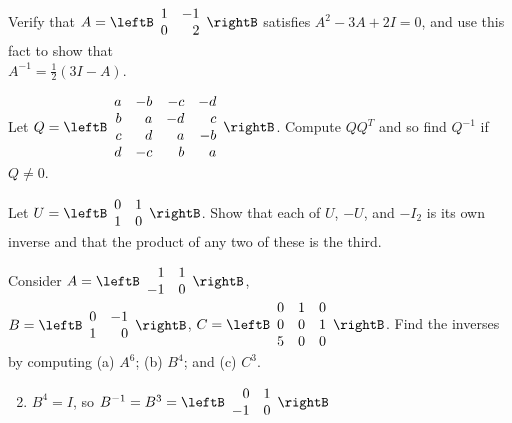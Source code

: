 \begin{multicols}{2}
\begin{ex}
Verify that $A = \leftB \begin{array}{rr}
1 & -1 \\
0 & 2
\end{array} \rightB$
 satisfies $A^{2} - 3A + 2I = 0$, and use this fact to show that \\$A^{-1} = \frac{1}{2}(3I - A)$.
\end{ex}

\begin{ex}
Let $Q = \leftB \begin{array}{rrrr}
a & -b & -c & -d \\
b & a & -d & c \\
c & d & a & -b \\
d & -c & b & a
\end{array} \rightB$. Compute $QQ^{T}$ and so find $Q^{-1}$ if $Q \neq 0$.
\end{ex}

\begin{ex}
Let $U = \leftB \begin{array}{rr}
0 & 1 \\
1 & 0
\end{array} \rightB$. Show that each of $U$, $-U$, and $-I_{2}$ is its own inverse and that the product of any two of these is the third.
\end{ex}

\begin{ex}
Consider $A = \leftB \begin{array}{rr}
1 & 1 \\
-1 & 0
\end{array} \rightB$, \\ $B = \leftB \begin{array}{rr}
0 & -1 \\
1 & 0
\end{array} \rightB$, $C = \leftB \begin{array}{rrr}
0 & 1 & 0 \\
0 & 0 & 1 \\
5 & 0 & 0
\end{array} \rightB$. Find the inverses by computing (a) $A^{6}$; (b) $B^{4}$; and (c) $C^{3}$.

\begin{sol}
\begin{enumerate}[label={\alph*.}]
\setcounter{enumi}{1}
\item $B^{4} = I$, so $B^{-1} = B^{3} = \leftB \begin{array}{rr}
0 & 1 \\
-1 & 0
\end{array} \rightB$


\end{enumerate}
\end{sol}
\end{ex}
\end{multicols}
